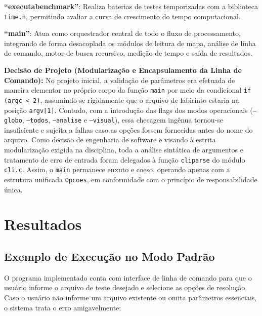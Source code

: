 \documentclass[12pt,a4paper]{article}
\renewcommand{\_}{\textunderscore\allowbreak}
\begin{document}
\textbf{“executa\_benchmark”}: Realiza baterias de testes temporizadas com a biblioteca \texttt{time.h}, permitindo avaliar a curva de crescimento do tempo computacional.

\textbf{“main”}: Atua como orquestrador central de todo o fluxo de processamento, integrando de forma desacoplada os módulos de leitura de mapa, análise de linha de comando, motor de busca recursivo, medição de tempo e saída de resultados.

\textbf{Decisão de Projeto (Modularização e Encapsulamento da Linha de Comando):} No projeto inicial, a validação de parâmetros era efetuada de maneira elementar no próprio corpo da função \texttt{main} por meio da condicional \texttt{if (argc < 2)}, assumindo-se rigidamente que o arquivo de labirinto estaria na posição \texttt{argv[1]}. Contudo, com a introdução das flags dos modos operacionais (\texttt{--globo}, \texttt{--todos}, \texttt{--analise} e \texttt{--visual}), essa checagem ingênua tornou-se insuficiente e sujeita a falhas caso as opções fossem fornecidas antes do nome do arquivo. Como decisão de engenharia de software e visando à estrita modularização exigida na disciplina, toda a análise sintática de argumentos e tratamento de erro de entrada foram delegados à função \texttt{cli\_parse} do módulo \texttt{cli.c}. Assim, o \texttt{main} permanece enxuto e coeso, operando apenas com a estrutura unificada \texttt{Opcoes}, em conformidade com o princípio de responsabilidade única.

\newpage
\section{Resultados}

\subsection{Exemplo de Execução no Modo Padrão}

O programa implementado conta com interface de linha de comando para que o usuário informe o arquivo de teste desejado e selecione as opções de resolução. Caso o usuário não informe um arquivo existente ou omita parâmetros essenciais, o sistema trata o erro amigavelmente:
\end{document}
